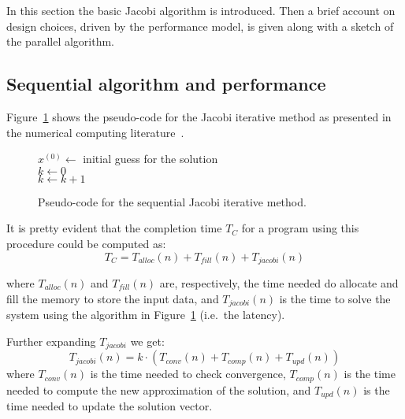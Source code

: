 In this section the basic Jacobi algorithm is introduced.
Then a brief account on design choices, driven by the performance model, is given along with a sketch of the parallel algorithm.

\subsection{Sequential algorithm and performance}\label{subsec:seq}
Figure~\ref{alg:sequantialjacobi} shows the pseudo-code for the Jacobi iterative method as presented in the numerical computing literature~\cite{}.
\begin{figure}[h]
	\begin{center}
	\begin{algorithm}[H]
		\BlankLine
		$x^{(0)} \leftarrow $ initial guess for the solution\\
		$k \leftarrow 0$\\
		{
			$k \leftarrow k + 1$\\
		}
	\end{algorithm}
	\end{center}
	\caption{Pseudo-code for the sequential Jacobi iterative method.}
	\label{alg:sequantialjacobi}
\end{figure}

It is pretty evident that the completion time $T_C$ for a program using this procedure could be computed as:
\[
	T_C = T_{alloc}(n) + T_{fill}(n) + T_{jacobi}(n)
\]

where $T_{alloc}(n)$ and $T_{fill}(n)$ are, respectively, the time needed do allocate and fill the memory to store the input data, and $T_{jacobi}(n)$ is the time to solve the system using the algorithm in Figure~\ref{alg:sequantialjacobi} (i.e.\ the latency).

Further expanding $T_{jacobi}$ we get:
\[
	T_{jacobi}(n) = k \cdot (T_{conv}(n) + T_{comp}(n) + T_{upd}(n))
\]
where $T_{conv}(n)$ is the time needed to check convergence, $T_{comp}(n)$ is the time needed to compute the new approximation of the solution, and $T_{upd}(n)$ is the time needed to update the solution vector.

